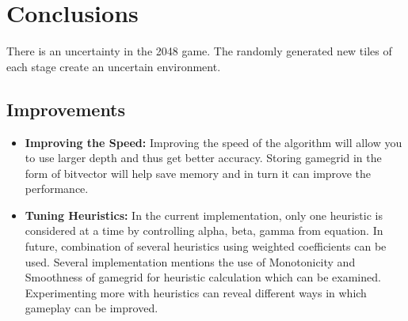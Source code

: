 \documentclass{svproc}
\begin{document}
    \section{Conclusions}
    There is an uncertainty in the 2048 game. The randomly generated new tiles of each stage create an uncertain environment.

    \subsection{Improvements}
    \begin{itemize}
        \item \textbf{Improving the Speed:} Improving the speed of the algorithm will allow you to use larger depth and thus get better accuracy. Storing gamegrid in the form of bitvector will help save memory and in turn it can improve the performance.

        \item \textbf{Tuning Heuristics:} In the current implementation, only one heuristic is considered at a time by controlling alpha, beta, gamma from equation. In future, combination of several heuristics using weighted coefficients can be used. Several implementation mentions the use of  Monotonicity and Smoothness of gamegrid for heuristic calculation which can be examined. Experimenting more with heuristics can reveal different ways in which gameplay can be improved.

    \end{itemize}

    
    
\end{document}
